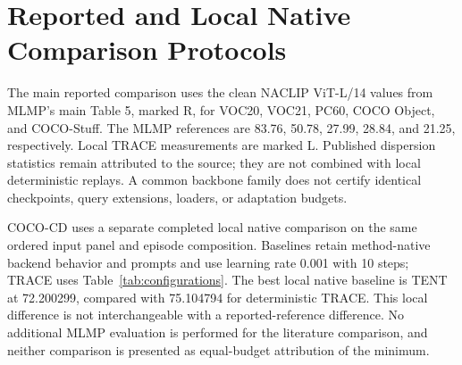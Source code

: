 \section{Reported and Local Native Comparison Protocols}
\label{app:native}
The main reported comparison uses the clean NACLIP ViT-L/14 values from MLMP's main Table 5, marked R, for VOC20, VOC21, PC60, COCO Object, and COCO-Stuff. The MLMP references are 83.76, 50.78, 27.99, 28.84, and 21.25, respectively. Local TRACE measurements are marked L. Published dispersion statistics remain attributed to the source; they are not combined with local deterministic replays. A common backbone family does not certify identical checkpoints, query extensions, loaders, or adaptation budgets.

COCO-CD uses a separate completed local native comparison on the same ordered input panel and episode composition. Baselines retain method-native backend behavior and prompts and use learning rate 0.001 with 10 steps; TRACE uses Table~\ref{tab:configurations}. The best local native baseline is TENT at 72.200299, compared with 75.104794 for deterministic TRACE. This local difference is not interchangeable with a reported-reference difference. No additional MLMP evaluation is performed for the literature comparison, and neither comparison is presented as equal-budget attribution of the minimum.


